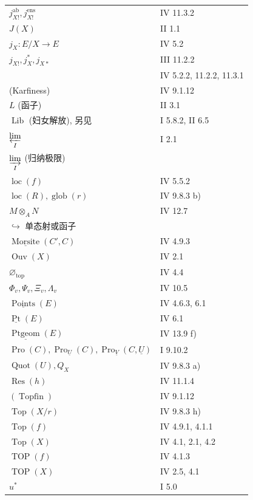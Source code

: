 \begin{longtable}{@{}p{.68\linewidth}p{.27\linewidth}@{}}
$j^{\mathrm{ab}}_{X!},j^{\mathrm{ens}}_{X!}$ & IV 11.3.2\\
$J(X)$ & II 1.1\\
$j_X:E/X\longrightarrow E$ & IV 5.2\\
$j_{X!},j_X^*,j_{X*}$ & III 11.2.2\\
& IV 5.2.2, 11.2.2, 11.3.1\\
(Karfiness) & IV 9.1.12\\
$L$ (函子) & II 3.1\\
$\operatorname{Lib}$ (妇女解放), 另见 & I 5.8.2, II 6.5\\
$\displaystyle\varprojlim_I$ & I 2.1\\
$\displaystyle\varinjlim_I$ (归纳极限) & \\
$\operatorname{loc}(f)$ & IV 5.5.2\\
$\operatorname{loc}(R),\operatorname{glob}(r)$ & IV 9.8.3 b)\\
$M\otimes_A N$ & IV 12.7\\
$\hookrightarrow$ 单态射或函子 & \\
$\underline{\operatorname{Morsite}}(C',C)$ & IV 4.9.3\\
$\operatorname{Ouv}(X)$ & IV 2.1\\
$\varnothing_{\mathrm{top}}$ & IV 4.4\\
$\Phi_v,\Psi_v,\Xi_v,\Lambda_v$ & IV 10.5\\
$\underline{\operatorname{Points}}(E)$ & IV 4.6.3, 6.1\\
$\underline{\operatorname{Pt}}(E)$ & IV 6.1\\
$\underline{\operatorname{Ptgeom}}(E)$ & IV 13.9 f)\\
$\operatorname{Pro}(C),\operatorname{Pro}_{\underline U}(C),\operatorname{Pro}_{\underline V}(C,\underline U)$ & I 9.10.2\\
$\operatorname{Quot}(U),Q_X$ & IV 9.8.3 a)\\
$\operatorname{Res}(h)$ & IV 11.1.4\\
$(\operatorname{Topfin})$ & IV 9.1.12\\
$\operatorname{Top}(X/r)$ & IV 9.8.3 h)\\
$\operatorname{Top}(f)$ & IV 4.9.1, 4.1.1\\
$\operatorname{Top}(X)$ & IV 4.1, 2.1, 4.2\\
$\operatorname{TOP}(f)$ & IV 4.1.3\\
$\operatorname{TOP}(X)$ & IV 2.5, 4.1\\
$u^*$ & I 5.0\\

\end{longtable}
